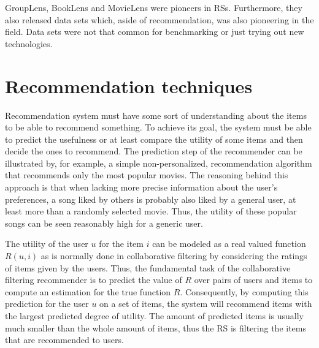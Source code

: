 \documentclass[12pt,a4paper,english
]{tutthesis}
\begin{document}
GroupLens, BookLens and MovieLens were pioneers in RSs. Furthermore, they also released data sets which, aside of recommendation, was also pioneering in the field. Data sets were not that common for benchmarking or just trying out new technologies. \cite{aggarwal16}


\section{Recommendation techniques}

Recommendation system must have some sort of understanding about the items to be able to recommend something. To achieve its goal, the system must be able to predict the usefulness or at least compare the utility of some items and then decide the ones to recommend. The prediction step of the recommender can be illustrated by, for example, a simple non-personalized, recommendation algorithm that recommends only the most popular movies. The reasoning behind this approach is that when lacking more precise information about the user's preferences, a song liked by others is probably also liked by a general user, at least more than a randomly selected movie. Thus, the utility of these popular songs can be seen reasonably high for a generic user. \cite{ricci11}

The utility of the user $u$ for the item $i$ can be modeled as a real valued function $R(u,i)$ as is normally done in collaborative filtering by considering the ratings of items given by the users. Thus, the fundamental task of the collaborative filtering recommender is to predict the value of $R$ over pairs of users and items to compute an estimation for the true function $R$. Consequently, by computing this prediction for the user $u$ on a set of items, the system will recommend items with the largest predicted degree of utility. The amount of predicted items is usually much smaller than the whole amount of items, thus the RS is filtering the items that are recommended to users. \cite{ricci11}
\end{document}
